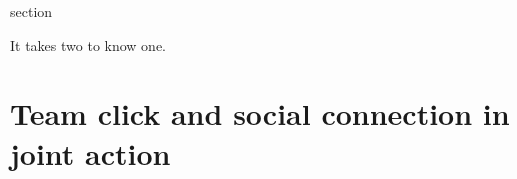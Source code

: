 section~\begin{savequote}[8cm]

  It takes two to know one.


\end{savequote}




\chapter{\label{chap:theory}Team click and social connection in joint action}

\minitoc


